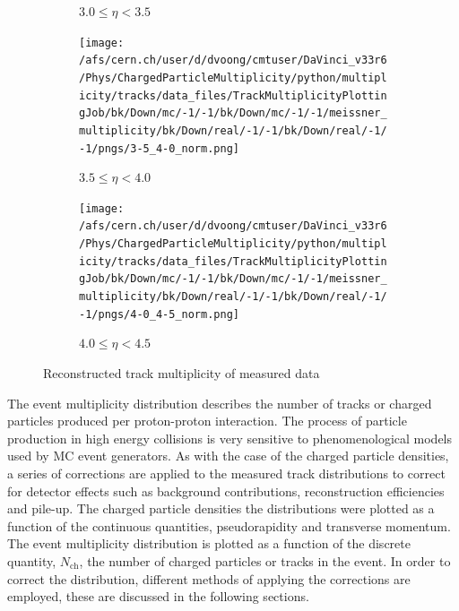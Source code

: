 \begin{figure}[h]
\begin{subfigure}[h]{0.32\textwidth}
		\caption{$3.0 \le \eta < 3.5$}
		\label{fig: reconstructed track multiplicity measured down 3.0 - 3.5}
	\end{subfigure}
	\begin{subfigure}[h]{0.32\textwidth}
		\texttt{[image: /afs/cern.ch/user/d/dvoong/cmtuser/DaVinci\_v33r6/Phys/ChargedParticleMultiplicity/python/multiplicity/tracks/data\_files/TrackMultiplicityPlottingJob/bk/Down/mc/-1/-1/bk/Down/mc/-1/-1/meissner\_multiplicity/bk/Down/real/-1/-1/bk/Down/real/-1/-1/pngs/3-5\_4-0\_norm.png]}
		\caption{$3.5 \le \eta < 4.0$}
		\label{fig: reconstructed track multiplicity measured down 3.5 - 4.0}
	\end{subfigure}
	\begin{subfigure}[h]{0.32\textwidth}
		\texttt{[image: /afs/cern.ch/user/d/dvoong/cmtuser/DaVinci\_v33r6/Phys/ChargedParticleMultiplicity/python/multiplicity/tracks/data\_files/TrackMultiplicityPlottingJob/bk/Down/mc/-1/-1/bk/Down/mc/-1/-1/meissner\_multiplicity/bk/Down/real/-1/-1/bk/Down/real/-1/-1/pngs/4-0\_4-5\_norm.png]}
		\caption{$4.0 \le \eta < 4.5$}
		\label{fig: reconstructed track multiplicity measured down 4.0 - 4.5}
	\end{subfigure}
	\caption{Reconstructed track multiplicity of measured data}
	\label{fig: reconstructed track multiplicity measured}
\end{figure}

The event multiplicity distribution describes the number of tracks or charged particles produced per proton-proton interaction. The process of particle production in high energy collisions is very sensitive to phenomenological models used by MC event generators. As with the case of the charged particle densities, a series of corrections are applied to the measured track distributions to correct for detector effects such as background contributions, reconstruction efficiencies and pile-up. The charged particle densities the distributions were plotted as a function of the continuous quantities, pseudorapidity and transverse momentum. The event multiplicity distribution is plotted as a function of the discrete quantity, $N_\mathrm{ch}$, the number of charged particles or tracks in the event. In order to correct the distribution, different methods of applying the corrections are employed, these are discussed in the following sections.

